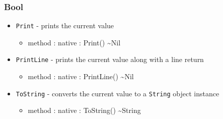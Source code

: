 \documentclass[11pt]{article}
\begin{document}
\subsubsection{Bool}
\begin{itemize}
\item \texttt{Print} - prints the current value
  \begin{itemize}
  \item method : native : Print() \textasciitilde Nil
  \end{itemize}
\item \texttt{PrintLine} - prints the current value along with a line
  return
  \begin{itemize}
  \item method : native : PrintLine() \textasciitilde Nil
  \end{itemize}
\item \texttt{ToString} - converts the current value to a
  \texttt{String} object instance
  \begin{itemize}
  \item method : native : ToString() \textasciitilde String
  \end{itemize}
\end{itemize}
\end{document}
